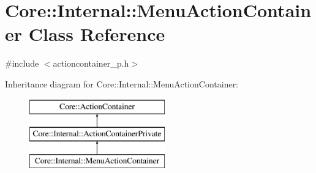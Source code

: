 \hypertarget{class_core_1_1_internal_1_1_menu_action_container}{\section{\-Core\-:\-:\-Internal\-:\-:\-Menu\-Action\-Container \-Class \-Reference}
\label{class_core_1_1_internal_1_1_menu_action_container}
}


{\ttfamily \#include $<$actioncontainer\-\_\-p.\-h$>$}

\-Inheritance diagram for \-Core\-:\-:\-Internal\-:\-:\-Menu\-Action\-Container\-:\begin{figure}[H]
\begin{center}
\leavevmode
\includegraphics[height=3.000000cm]{class_core_1_1_internal_1_1_menu_action_container}
\end{center}
\end{figure}
